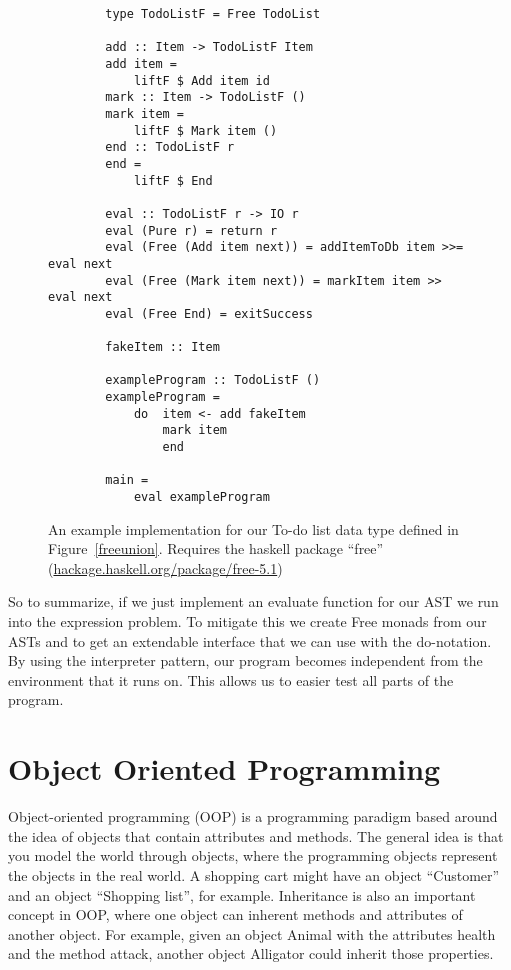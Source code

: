 \documentclass[12pt]{report}
\theoremstyle{definition}
\theoremstyle{theorem}
\begin{document}
\begin{figure}[H]
    \begin{lstlisting}
        type TodoListF = Free TodoList

        add :: Item -> TodoListF Item
        add item = 
            liftF $ Add item id
        mark :: Item -> TodoListF ()
        mark item = 
            liftF $ Mark item ()
        end :: TodoListF r
        end = 
            liftF $ End

        eval :: TodoListF r -> IO r
        eval (Pure r) = return r
        eval (Free (Add item next)) = addItemToDb item >>= eval next
        eval (Free (Mark item next)) = markItem item >> eval next
        eval (Free End) = exitSuccess

        fakeItem :: Item

        exampleProgram :: TodoListF ()
        exampleProgram = 
            do  item <- add fakeItem 
                mark item 
                end

        main = 
            eval exampleProgram
    \end{lstlisting}
    \caption{An example implementation for our To-do list data type defined in
    Figure~\ref{freeunion}. Requires the haskell package ``free''
    (\protect\url{hackage.haskell.org/package/free-5.1})}
    \label{freeprogram}
\end{figure}

So to summarize, if we just implement an evaluate function for our AST we run
into the expression problem. To mitigate this we create Free monads from our
ASTs and to get an extendable interface that we can use with the do-notation. By
using the interpreter pattern, our program becomes independent from the
environment that it runs on. This allows us to easier test all parts of the
program.

\section{Object Oriented Programming}\label{oop}

Object-oriented programming (OOP) is a programming paradigm based around the
idea of objects that contain attributes and methods. The general idea is that
you model the world through objects, where the programming objects represent the
objects in the real world. A shopping cart might have an object ``Customer'' and
an object ``Shopping list'', for example. Inheritance is also an important
concept in OOP, where one object can inherent methods and attributes of another
object.  For example, given an object Animal with the attributes health and the
method attack, another object Alligator could inherit those
properties.~\cite{Gamma:1995:DPE:186897}
\end{document}
